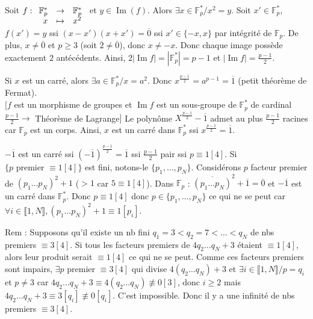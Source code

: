 \begin{solution}
Soit $f : \begin{array}[t]{rcl} \mathbb{F}_p^* & \to & \mathbb{F}_p^* \\ x & \mapsto & x^2 \end{array}$ et $y \in \operatorname{Im}(f)$.
Alors $\exists x \in \mathbb{F}_p^* / x^2 = y$. Soit $x' \in \mathbb{F}_p^*$, $f(x') = y$ ssi $(x - x')(x + x') = \overline{0}$ ssi $x' \in \{-x, x\}$ par intégrité de $\mathbb{F}_p$. De plus, $x \neq \overline{0}$ et $p \geq 3$ (soit $\overline{2} \neq \overline{0}$), donc $x \neq -x$.
Donc chaque image possède exactement $2$ antécédents.
Ainsi, $2 |\operatorname{Im} f| = |\mathbb{F}_p^*| = p - 1$ et $|\operatorname{Im} f| = \frac{p-1}{2}$.

Si $x$ est un carré, alors $\exists a \in \mathbb{F}_p^* / x = a^2$.
Donc $x^{\frac{p-1}{2}} = a^{p-1} = \overline{1}$ (petit théorème de Fermat). \\
$\big[f$ est un morphisme de groupes et $\operatorname{Im} f$ est un sous-groupe de $\mathbb{F}_p^*$ de cardinal $\frac{p-1}{2} \longrightarrow$ Théorème de Lagrange$\big]$
Le polynôme $X^{\frac{p-1}{2}} - \overline{1}$ admet au plus $\frac{p-1}{2}$ racines car $\mathbb{F}_p$ est un corps.
Ainsi, $x$ est un carré dans $\mathbb{F}_p^*$ ssi $x^{\frac{p-1}{2}} = \overline{1}$.

$-\overline{1}$ est un carré ssi $(-\overline{1})^{\frac{p-1}{2}} = \overline{1}$ ssi $\frac{p-1}{2}$ pair ssi $p \equiv 1 [4]$.
Si $\{p \text{ premier } \equiv 1 [4]\}$ est fini, notons-le $\{p_1, \dots, p_N\}$.
Considérons $p$ facteur premier de $(p_1 \dots p_N)^2 + 1$ ($> 1$ car $5 \equiv 1 [4]$).
Dans $\mathbb{F}_p$ : $\overline{(p_1 \dots p_N)}^2 + \overline{1} = \overline{0}$ et $-\overline{1}$ est un carré dans $\mathbb{F}_p^*$.
Donc $p \equiv 1 [4]$ donc $p \in \{p_1, \dots, p_N\}$ ce qui ne se peut car $\forall i \in \llbracket 1, N \rrbracket, (p_1 \dots p_N)^2 + 1 \equiv 1 [p_i]$.

\begin{remarkbox}
Rem : Supposons qu'il existe un nb fini $q_1 = 3 < q_2 = 7 < \dots < q_N$ de nbs premiers $\equiv 3 [4]$. Si tous les facteurs premiers de $4 q_2 \dots q_N + 3$ étaient $\equiv 1 [4]$, alors leur produit serait $\equiv 1 [4]$ ce qui ne se peut.
Comme ces facteurs premiers sont impairs, $\exists p$ premier $\equiv 3 [4]$ qui divise $4(q_2 \dots q_N) + 3$ et $\exists i \in \llbracket 1, N \rrbracket / p = q_i$ et $p \neq 3$ car $4 q_2 \dots q_N + 3 \equiv 4(q_2 \dots q_N) \not\equiv 0 [3]$, donc $i \geq 2$ mais $4 q_2 \dots q_N + 3 \equiv 3 [q_i] \not\equiv 0 [q_i]$.
C'est impossible. Donc il y a une infinité de nbs premiers $\equiv 3 [4]$.
\end{remarkbox}
\end{solution}

